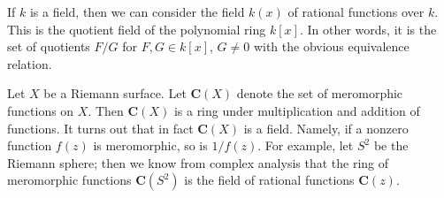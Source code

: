 \begin{example}
\label{example-field-of-rational-functions}
If $k$ is a field, then we can consider the field $k(x)$ of rational
functions over $k$. This is the quotient field of the polynomial ring
$k[x]$. In other words, it is the set of quotients $F/G$ for
$F, G \in k[x]$, $G \not = 0$ with the obvious equivalence relation.
\end{example}

\begin{example}
\label{example-field-of-meromorphic-functions}
Let $X$ be a Riemann surface. Let $\mathbf{C}(X)$ denote the
set of meromorphic functions on $X$. Then $\mathbf{C}(X)$ is a ring under
multiplication and addition of functions. It turns out that in fact
$\mathbf{C}(X)$ is a field. Namely, if a nonzero function $f(z)$ is
meromorphic, so is $1/f(z)$. For example, let $S^2$ be the Riemann
sphere; then we know from complex analysis that the ring of meromorphic
functions $\mathbf{C}(S^2)$ is the field of rational functions $\mathbf{C}(z)$.
\end{example}



